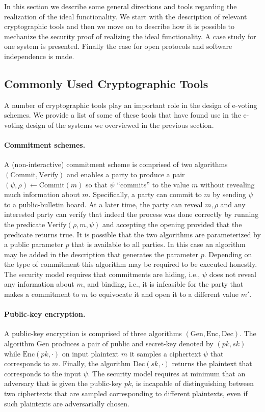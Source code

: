 In this section we describe some general directions and tools
regarding the realization of the ideal functionality. We start with
the description of relevant cryptographic tools and then we move on to
describe how it is possible to mechanize the security proof of
realizing the ideal functionality.  A case study for one system is
presented. Finally the case for open protocols and software
independence is made.

\subsection{Commonly Used Cryptographic Tools}

A number of cryptographic tools play an important role in the design
of e-voting schemes. We provide a list of some of these tools that
have found use in the e-voting design of the systems we overviewed in
the previous section.

\paragraph{Commitment schemes.} A (non-interactive) commitment scheme
is comprised of two algorithms $(\mathrm{Commit}, \mathrm{Verify})$
and enables a party to produce a pair
$(\psi, \rho) \leftarrow \mathrm{Commit}(m)$ so that $\psi$
``commits'' to the value $m$ without revealing much information about
$m$. Specifically, a party can commit to $m$ by sending $\psi$ to a
public-bulletin board. At a later time, the party can reveal $m,\rho$
and any interested party can verify that indeed the process was done
correctly by running the predicate $\mathrm{Verify}(\rho, m, \psi)$
and accepting the opening provided that the predicate returns true.
It is possible that the two algorithms are parameterized by a public
parameter $p$ that is available to all parties. In this case an
algorithm may be added in the description that generates the parameter
$p$. Depending on the type of commitment this algorithm may be
required to be executed honestly. The security model requires that
commitments are hiding, i.e., $\psi$ does not reveal any information
about $m$, and binding, i.e., it is infeasible for the party that
makes a commitment to $m$ to equivocate it and open it to a different
value $m'$.

\paragraph{Public-key encryption.} A public-key encryption is
comprised of three algorithms
$(\mathrm{Gen},\mathrm{Enc}, \mathrm{Dec})$.  The algorithm
$\mathrm{Gen}$ produces a pair of public and secret-key denoted by
$(pk,sk)$ while $\mathrm{Enc}(pk, \cdot )$ on input plaintext $m$ it
samples a ciphertext $\psi$ that corresponds to $m$. Finally, the
algorithm $\mathrm{Dec}(sk, \cdot )$ returns the plaintext that
corresponds to the input $\psi$. The security model requires at
minimum that an adversary that is given the public-key $pk$, is
incapable of distinguishing between two ciphertexts that are sampled
corresponding to different plaintexts, even if such plaintexts are
adversarially chosen.

